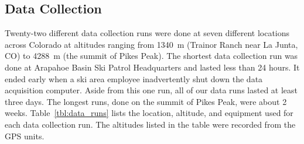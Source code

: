 \documentclass[prb,preprint]{revtex4-1}
\begin{document}
\subsection{Data Collection}
Twenty-two different data collection runs were done at seven different locations across Colorado at altitudes ranging from 1340~m (Trainor Ranch near La Junta, CO) to 4288~m (the summit of Pikes Peak). The shortest data collection run was done at Arapahoe Basin Ski Patrol Headquarters and lasted less than 24 hours. It ended early when a ski area employee inadvertently shut down the data acquisition computer. Aside from this one run, all of our data runs lasted at least three days. The longest runs, done on the summit of Pikes Peak, were about 2 weeks. Table~\ref{tbl:data_runs} lists the location, altitude, and equipment used for each  data collection run. The altitudes listed in the table were recorded from the GPS units.   
\end{document}
